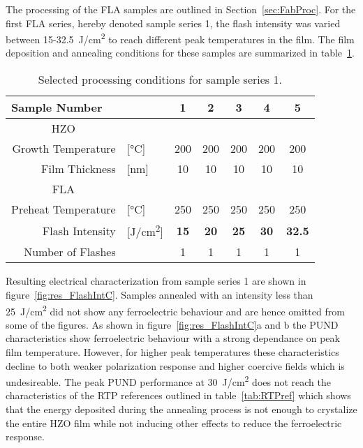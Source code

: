 \documentclass[11pt,twoside]{eitExjobb}
\begin{document}
The processing of the FLA samples are outlined in Section~\ref{sec:FabProc}. For the first FLA series, hereby denoted sample series 1, the flash intensity was varied between 15-\SI{32.5}{\joule/\centi\meter^2} to reach different peak temperatures in the film. The film deposition and annealing conditions for these samples are summarized in table~\ref{tab:FlashIntC}.

\begin{table}[htbp]
    \centering
    \caption{Selected processing conditions for sample series 1.}\label{tab:FlashIntC}
    \begin{tabular}{rlccccc}
        \toprule
        \multicolumn{2}{l}{Sample Number} & 1 & 2 & 3 & 4 & 5 \\\midrule
        \multicolumn{1}{c}{HZO} & & & & & & \\
        Growth Temperature & [\si{\celsius}] & 200 & 200 & 200 & 200 & 200 \\
        Film Thickness & [\si{\nano\meter}] & 10 & 10 & 10 & 10 & 10 \\\midrule
        \multicolumn{1}{c}{FLA} & & & & & & \\
        Preheat Temperature & [\si{\celsius}] & 250 & 250 & 250 & 250 & 250 \\
        Flash Intensity & [\si{\joule/\centi\meter^2}] & \textbf{15} & \textbf{20} & \textbf{25} & \textbf{30} & \textbf{32.5} \\
        Number of Flashes & & 1 & 1 & 1 & 1 & 1 \\\bottomrule
    \end{tabular}
\end{table}

Resulting electrical characterization from sample series 1 are shown in figure~\ref{fig:res_FlashIntC}. Samples annealed with an intensity less than \SI{25}{\joule/\centi\meter^2} did not show any ferroelectric behaviour and are hence omitted from some of the figures. As shown in figure~\ref{fig:res_FlashIntC}a and b the PUND characteristics show ferroelectric behaviour with a strong dependance on peak film temperature. However, for higher peak temperatures these characteristics decline to both weaker polarization response and higher coercive fields which is undesireable. The peak PUND performance at \SI{30}{\joule/\centi\meter^2} does not reach the characteristics of the RTP references outlined in table~\ref{tab:RTPref} which shows that the energy deposited during the annealing process is not enough to crystalize the entire HZO film while not inducing other effects to reduce the ferroelectric response.
\end{document}
